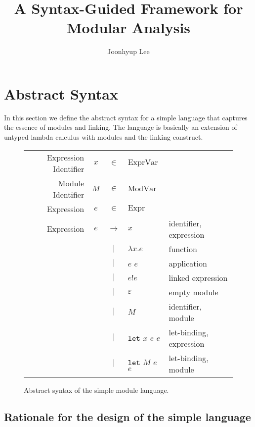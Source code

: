 \documentclass[acmsmall,screen,review]{acmart}
\title{A Syntax-Guided Framework for Modular Analysis}
\author{Joonhyup Lee}
\theoremstyle{definition}
\newcommand*{\vbar}{|}
\newcommand*{\Expr}{\text{Expr}}
\newcommand*{\ExprVar}{\text{ExprVar}}
\newcommand*{\ModVar}{\text{ModVar}}
\newcommand*{\link}[2]{{#1}\mathtt{!}{#2}}
\newcommand*{\Let}{\mathtt{let}}
\begin{document}
\maketitle

\section{Abstract Syntax}

In this section we define the abstract syntax for a simple language that captures the essence of modules and linking.
The language is basically an extension of untyped lambda calculus with modules and the linking construct.

\begin{figure}[htb]
  \centering
  \footnotesize
  \begin{tabular}{rccll}
    Expression Identifier & $x$ & $\in$         & $\ExprVar$                                   \\
    Module Identifier     & $M$ & $\in$         & $\ModVar$                                    \\
    Expression            & $e$ & $\in$         & $\Expr$                                      \\
    Expression            & $e$ & $\rightarrow$ & $x$                & identifier, expression  \\
                          &     & $\vbar$       & $\lambda x.e$      & function                \\
                          &     & $\vbar$       & $e$ $e$            & application             \\
                          &     & $\vbar$       & $\link{e}{e}$      & linked expression       \\
                          &     & $\vbar$       & $\varepsilon$      & empty module            \\
                          &     & $\vbar$       & $M$                & identifier, module      \\
                          &     & $\vbar$       & $\Let$ $x$ $e$ $e$ & let-binding, expression \\
                          &     & $\vbar$       & $\Let$ $M$ $e$ $e$ & let-binding, module     \\
  \end{tabular}
  \caption{Abstract syntax of the simple module language.}
\end{figure}
\subsection{Rationale for the design of the simple language}
\end{document}
